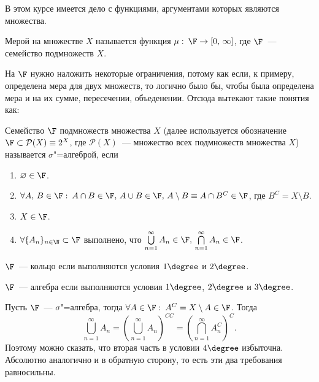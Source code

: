\newpage
{}

В этом курсе имеется дело с функциями, аргументами которых являются множества.
\begin{definition}
	Мерой на множестве $X$ называется функция
	$\mu:\: \F \rightarrow [0,\, \infty]$, где $\F$~--- семейство подмножеств $X$.
\end{definition}

На $\F$ нужно наложить некоторые ограничения, потому как если, к примеру, определена мера для двух множеств,
то логично было бы, чтобы была определена мера и на их сумме, пересечении, объеденении. Отсюда вытекают такие понятия как:

\begin{definition}
	Семейство $\F$ подмножеств множества $X$ (далее используется обозначение $\F \subset \mathcal{P} (X)\equiv 2^{X}$, где
	$\mathcal{P} (X)$~--- множество всех подмножеств множества $X$) называется $\sigma$"=алгеброй, если
	\begin{enumerate}[label=\arabic*\degree.]
		\item $\varnothing\in \F$.
		\item $\forall A,\, B\in\F:\: A\cap B\in\F,\,A\cup B\in\F,\, A\setminus B\equiv A\cap B^C\in\F$, где
		      $B^C=X\setminus B$.
		\item $X\in\F$.
		\item $\forall \{A_n\}_{n\in\N}\subset\F$ выполнено, что
		      $\bigcup\limits_{n=1}^{\infty}A_n\in\F,\,\bigcap\limits_{n=1}^{\infty}A_n\in\F$.
	\end{enumerate}
\end{definition}

\begin{definition}
	$\F$~--- кольцо если выполняются условия $1\degree$ и $2\degree$.
\end{definition}
\begin{definition}
	$\F$~--- алгебра если выполняются условия $1\degree$, $2\degree$ и $3\degree$.
\end{definition}

\begin{remark}
	Пусть $\F$~--- $\sigma$"=алгебра, тогда $\forall A\in\F:\: A^C=X\setminus A\in\F$. Тогда
	\[
		\bigcup\limits_{n=1}^{\infty}A_n=\left(\bigcup\limits_{n=1}^{\infty}A_n\right)^{CC}=
		\left(\bigcap\limits_{n=1}^{\infty}A_n^C\right)^C.
	\]
	Поэтому можно сказать, что вторая часть в условии $4\degree$ избыточна. Абсолютно аналогично и в обратную сторону,
	то есть эти два требования равносильны.
	\label{lect1remark1}
\end{remark}

